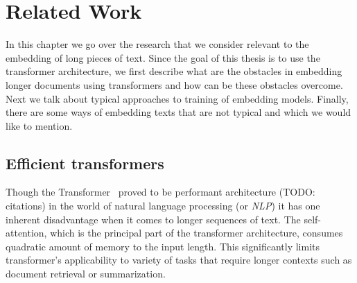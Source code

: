 \chapter{Related Work}








In this chapter we go over the research that we consider relevant to the
embedding of long pieces of text. Since the goal of this thesis is to use the
transformer architecture, we first describe what are the obstacles in embedding
longer documents using transformers and how can be these obstacles overcome.
Next we talk about typical approaches to training of embedding models. Finally,
there are some ways of embedding texts that are not typical and which we would
like to mention.

\section{Efficient transformers}






Though the Transformer~\cite{vaswani2017attention} proved to be performant
architecture (TODO: citations) in the world of natural language processing (or
\emph{NLP}) it has one inherent disadvantage when it comes to longer sequences
of text. The self-attention, which is the principal part of the transformer
architecture, consumes quadratic amount of memory to the input length. This
significantly limits transformer's applicability to variety of tasks that
require longer contexts such as document retrieval or summarization.

